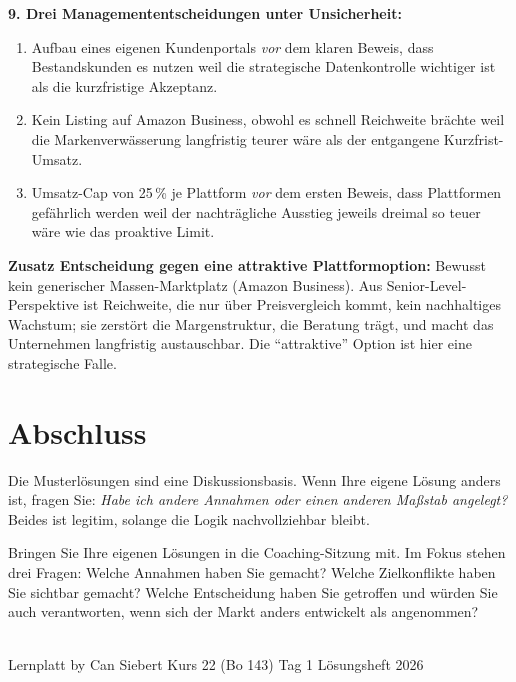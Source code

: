 \documentclass[11pt,a4paper,oneside]{article}
\begin{document}
\begin{loesungbox}
\textbf{9. Drei Managemententscheidungen unter Unsicherheit:}
\begin{enumerate}
  \item Aufbau eines eigenen Kundenportals \emph{vor} dem klaren Beweis, dass Bestandskunden es nutzen \textendash{} weil die strategische Datenkontrolle wichtiger ist als die kurzfristige Akzeptanz.
  \item Kein Listing auf Amazon Business, obwohl es schnell Reichweite brächte \textendash{} weil die Markenverwässerung langfristig teurer wäre als der entgangene Kurzfrist-Umsatz.
  \item Umsatz-Cap von 25\,\% je Plattform \emph{vor} dem ersten Beweis, dass Plattformen gefährlich werden \textendash{} weil der nachträgliche Ausstieg jeweils dreimal so teuer wäre wie das proaktive Limit.
\end{enumerate}

\textbf{Zusatz \textendash{} Entscheidung gegen eine attraktive Plattformoption:} Bewusst kein generischer Massen-Marktplatz (Amazon Business). Aus Senior-Level-Perspektive ist Reichweite, die nur über Preisvergleich kommt, kein nachhaltiges Wachstum; sie zerstört die Margenstruktur, die Beratung trägt, und macht das Unternehmen langfristig austauschbar. Die ``attraktive'' Option ist hier eine strategische Falle.
\end{loesungbox}

\clearpage

\section*{Abschluss}
\thispagestyle{plain}

\noindent Die Musterlösungen sind eine Diskussionsbasis. Wenn Ihre eigene Lösung anders ist, fragen Sie: \emph{Habe ich andere Annahmen \textendash{} oder einen anderen Maßstab angelegt?} Beides ist legitim, solange die Logik nachvollziehbar bleibt.

\medskip
\begin{infobox}
Bringen Sie Ihre eigenen Lösungen in die Coaching-Sitzung mit. Im Fokus stehen drei Fragen: Welche Annahmen haben Sie gemacht? Welche Zielkonflikte haben Sie sichtbar gemacht? Welche Entscheidung haben Sie getroffen \textendash{} und würden Sie auch verantworten, wenn sich der Markt anders entwickelt als angenommen?
\end{infobox}

\vspace{1cm}
\noindent{\color{lpAccent}\rule{\linewidth}{0.6pt}}\\[4pt]
{\footnotesize\sffamily\color{lpGray}Lernplatt \textperiodcentered{} by Can Siebert \textperiodcentered{} Kurs 22 (Bo 143) \textperiodcentered{} Tag 1 \textperiodcentered{} Lösungsheft \textperiodcentered{} \textcopyright{} 2026}
\end{document}
